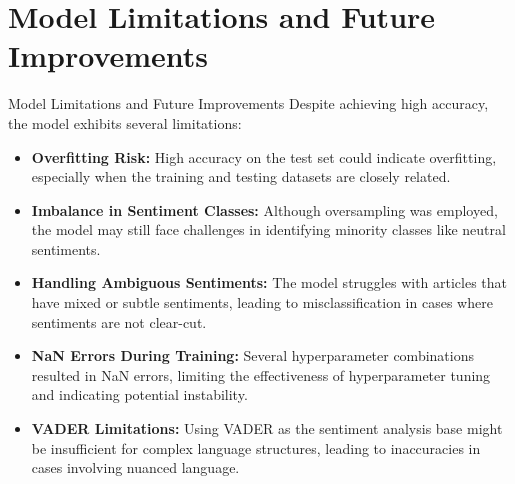 \documentclass{beamer}
\begin{document}
\section{Model Limitations and Future Improvements}
\begin{frame}{Model Limitations and Future Improvements}
    Despite achieving high accuracy, the model exhibits several limitations:
    \begin{itemize}
        \item \textbf{Overfitting Risk:} High accuracy on the test set could indicate overfitting, especially when the training and testing datasets are closely related.
        \item \textbf{Imbalance in Sentiment Classes:} Although oversampling was employed, the model may still face challenges in identifying minority classes like neutral sentiments.
        \item \textbf{Handling Ambiguous Sentiments:} The model struggles with articles that have mixed or subtle sentiments, leading to misclassification in cases where sentiments are not clear-cut.
        \item \textbf{NaN Errors During Training:} Several hyperparameter combinations resulted in NaN errors, limiting the effectiveness of hyperparameter tuning and indicating potential instability.
        \item \textbf{VADER Limitations:} Using VADER as the sentiment analysis base might be insufficient for complex language structures, leading to inaccuracies in cases involving nuanced language.
    \end{itemize}
\end{frame}
\end{document}
